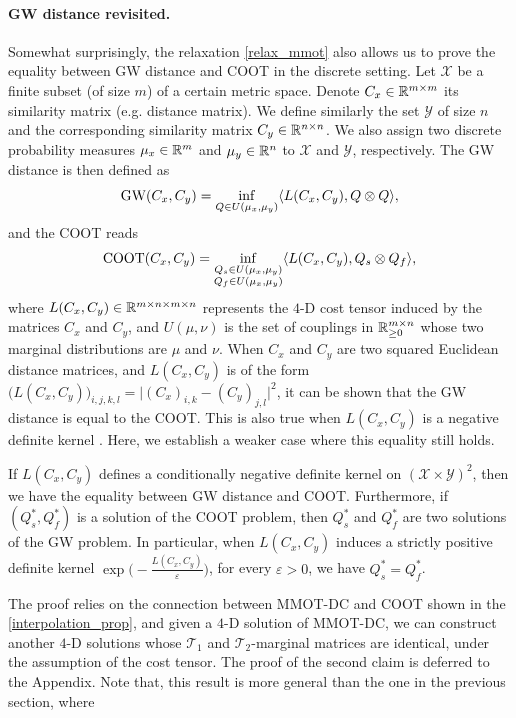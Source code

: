 \paragraph{GW distance revisited.} Somewhat surprisingly, the relaxation \ref{relax_mmot} also allows us to prove the equality
between GW distance and COOT in the discrete setting. Let $\mathcal X$ be a
finite subset (of size $m$) of a certain metric space. Denote $C_x \in \mathbb R^{m \times m}$ its similarity matrix (e.g. distance
matrix). We define similarly the set $\mathcal Y$ of size $n$ and the corresponding similarity matrix $C_y \in \mathbb R^{n \times n}$.
We also assign two discrete probability measures $\mu_x \in \mathbb R^m$ and $\mu_y \in \mathbb R^n$ to $\mathcal X$ and $\mathcal Y$,
respectively. The GW distance is then defined as
\begin{equation*}
  \text{GW}(C_x, C_y) = \inf_{Q \in U(\mu_x, \mu_y)} \langle L(C_x, C_y), Q \otimes Q \rangle,
\end{equation*}
and the COOT reads
\begin{equation*}
  \text{COOT}(C_x, C_y) = \inf_{\substack{Q_s \in U(\mu_x, \mu_y) \\ Q_f \in U(\mu_x, \mu_y)}}
  \langle L(C_x, C_y), Q_s \otimes Q_f \rangle,
\end{equation*}
where $L(C_x,C_y) \in \mathbb R^{m \times n \times m \times n}$ represents the $4$-D cost tensor induced by the matrices $C_x$ and $C_y$,
and $U(\mu, \nu)$ is the set of couplings in $\mathbb R^{m \times n}_{\geq 0}$ whose two marginal distributions are $\mu$ and
$\nu$. When $C_x$ and $C_y$ are two squared Euclidean distance matrices, and $L(C_x,C_y)$ is of the form
$\big(L(C_x,C_y)\big)_{i,j,k,l} = \vert (C_x)_{i,k} - (C_y)_{j,l} \vert^2$, it can be shown that the GW distance is equal
to the COOT. This is also true when $L(C_x, C_y)$ is a negative definite kernel \citep{Sejourne20}.
Here, we establish a weaker case where this equality still holds.
\begin{corollary} \label{kernel_gw_coot}
  If $L(C_x, C_y)$ defines a conditionally negative definite kernel on $(\mathcal X \times \mathcal Y)^2$, then we have the equality
  between GW distance and COOT. Furthermore, if $(Q_s^*,Q_f^*)$ is a solution of the COOT problem, then $Q_s^*$ and $Q_f^*$ are
  two solutions of the GW problem. In particular, when $L(C_x, C_y)$ induces a strictly positive definite kernel
  $\exp \big( -\frac{L(C_x, C_y)}{\varepsilon} \big)$, for every $\varepsilon > 0$, we have $Q_s^* = Q_f^*$.
\end{corollary}
The proof relies on the connection between MMOT-DC and COOT shown in the \cref{interpolation_prop},
and given a
$4$-D solution of MMOT-DC, we can construct another $4$-D solutions whose
$\mathcal T_1$ and $\mathcal T_2$-marginal matrices are identical,
under the assumption of the cost tensor. The proof of the second claim is deferred to the Appendix.
Note that, this result is more general than the one in the previous section, where


